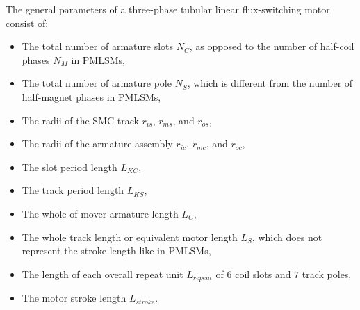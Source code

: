         
        The general parameters of a three-phase tubular linear flux-switching motor consist of:
        
        \begin{itemize}
            \item The total number of armature slots $N_C$, as opposed to the number of half-coil phases $N_M$ in \acsp{PMLSM},
            \item The total number of armature pole $N_S$, which is different from the number of half-magnet phases in \acsp{PMLSM},
            \item The radii of the \acs{SMC} track $r_{is}$, $r_{ms}$, and $r_{os}$,
            \item The radii of the armature assembly $r_{ic}$, $r_{mc}$, and $r_{oc}$,
            \item The slot period length $L_{KC}$,
            \item The track period length $L_{KS}$,
            \item The whole of mover armature length $L_{C}$,
            \item The whole track length or equivalent motor length $L_{S}$, which does not represent the stroke length like in \acsp{PMLSM},
            \item The length of each overall repeat unit $L_{repeat}$ of $6$ coil slots and $7$ track poles,
            \item The motor stroke length $L_{stroke}$.
        \end{itemize}
        
